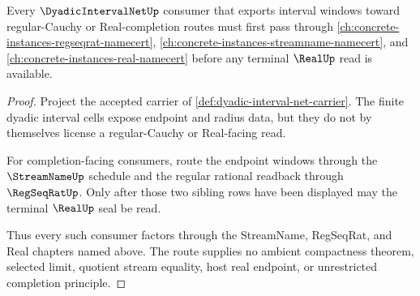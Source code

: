 \begin{theorem}
\label{thm:dyadic-interval-net-regular-cauchy-real-forward-route}
Every $\DyadicIntervalNetUp$ consumer that exports interval windows toward regular-Cauchy or Real-completion routes must first pass through \autoref{ch:concrete-instances-regseqrat-namecert}, \autoref{ch:concrete-instances-streamname-namecert}, and \autoref{ch:concrete-instances-real-namecert} before any terminal $\RealUp$ read is available.
\end{theorem}
\begin{proof}
Project the accepted carrier of \autoref{def:dyadic-interval-net-carrier}. The finite dyadic interval cells expose endpoint and radius data, but they do not by themselves license a regular-Cauchy or Real-facing read.

For completion-facing consumers, route the endpoint windows through the $\StreamNameUp$ schedule and the regular rational readback through $\RegSeqRatUp$. Only after those two sibling rows have been displayed may the terminal $\RealUp$ seal be read.

Thus every such consumer factors through the StreamName, RegSeqRat, and Real chapters named above. The route supplies no ambient compactness theorem, selected limit, quotient stream equality, host real endpoint, or unrestricted completion principle.
\end{proof}

